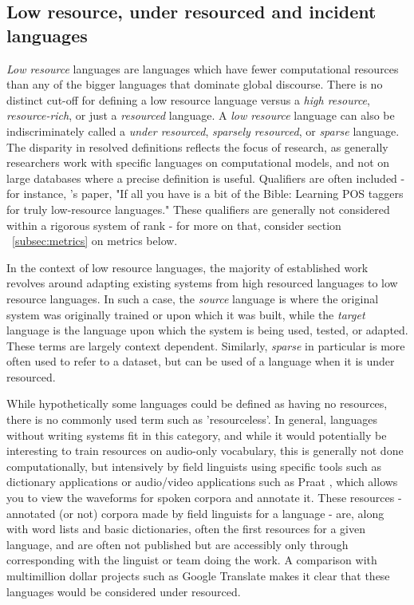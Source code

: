 \subsection{Low resource, under resourced and incident languages}

\textit{Low resource} languages are languages which have fewer computational resources than any of the bigger languages that dominate global discourse. There is no distinct cut-off for defining a low resource language versus a \textit{high resource}, \textit{resource-rich}, or just a \textit{resourced} language. A \textit{low resource} language can also be indiscriminately called a \textit{under resourced}, \textit{sparsely resourced}, or \textit{sparse} language. The disparity in resolved definitions reflects the focus of research, as generally researchers work with specific languages on computational models, and not on large databases where a precise definition is useful. Qualifiers are often included - for instance, \citet{agic2015if}'s paper, "If all you have is a bit of the Bible: Learning POS taggers for truly low-resource languages." These qualifiers are generally not considered within a rigorous system of rank - for more on that, consider section ~\ref{subsec:metrics} on metrics below.

In the context of low resource languages, the majority of established work revolves around adapting existing systems from high resourced languages to low resource languages. In such a case, the \textit{source} language is where the original system was originally trained or upon which it was built, while the \textit{target} language is the language upon which the system is being used, tested, or adapted. These terms are largely context dependent. Similarly, \textit{sparse} in particular is more often used to refer to a dataset, but can be used of a language when it is under resourced.

While hypothetically some languages could be defined as having no resources, there is no commonly used term such as 'resourceless'. In general, languages without writing systems fit in this category, and while it would potentially be interesting to train resources on audio-only vocabulary, this is generally not done computationally, but intensively by field linguists using specific tools such as dictionary applications or audio/video applications such as Praat \citep{boersma2009praat}, which allows you to view the waveforms for spoken corpora and annotate it. These resources - annotated (or not) corpora made by field linguists for a language - are, along with word lists and basic dictionaries, often the first resources for a given language, and are often not published but are accessibly only through corresponding with the linguist or team doing the work. A comparison with multimillion dollar projects such as Google Translate makes it clear that these languages would be considered under resourced.

